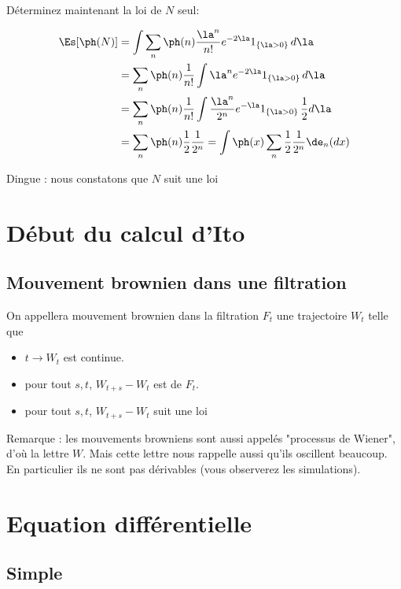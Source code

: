 \documentclass{article}
\begin{document}
Déterminez maintenant la loi de $N$ seul: 
\begin{grostro}
\begin{alignat*}{1}
\Es[\ph(N )]
& = \int  \sum_n   \ph(   n  )      \frac  {\la^n}{n !}       e^{- 2\la } 1_{\{\la >0\}}\, d\la    \\ 
& =  \sum_n   \ph(  n  )  \frac 1   {n !}    \int       {\la^n}       e^{- 2\la } 1_{\{ \la >0\}}\, d\la    \\ 
& =  \sum_n   \ph(  n  )  \frac 1   {n !}    \int       \frac {\la^n}{2^n}       e^{-\la } 1_{\{ \la >0\}}\,  \frac 1 2 d\la    \\ 
& =  \sum_n   \ph(  n  )  \frac 1   {2}          \frac {1}{2^n}      = \int\ph(x) \sum_n \frac 12 \frac 1 {2^n} \de_n(dx)    
\end{alignat*}
\end{grostro}
Dingue : nous constatons que $N$ suit  une loi 



\section{Début du calcul d'Ito }

\subsection{Mouvement brownien dans une filtration}

On appellera mouvement brownien dans la filtration $F_t$ une trajectoire $W_t$ telle que 
\begin{itemize}
\item $t \to W_t$ est continue. 
\item pour tout $s,t$, $W_{t+s}-W_t$ est  de $F_t$.
 \item pour tout $s,t$, $W_{t+s}-W_t$ suit une loi   
\end{itemize}
 Remarque :  les mouvements browniens sont aussi appelés "processus de Wiener", d'où la lettre $W$.  Mais cette lettre nous rappelle aussi qu'ils oscillent beaucoup.  En particulier ils ne sont pas dérivables (vous observerez les simulations). 


\section{Equation différentielle}

\subsection{Simple}
 
\end{document}
